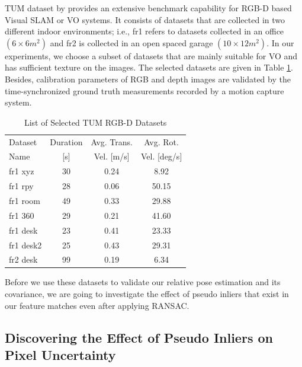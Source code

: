 \documentclass[12pt]{report}
\numberwithin{figure}{section}
\begin{document}
TUM dataset by \parencite{Sturm2012a} provides an extensive benchmark 
capability for RGB-D based Visual SLAM or VO systems. It consists of datasets 
that are collected in two different indoor environments; i.e., fr1 refers to 
datasets collected in an office $(6\times 6 m^2)$ and fr2 is collected in an 
open spaced garage $(10\times 12m^2)$. In our experiments, we choose a subset 
of datasets that are mainly suitable for VO and has sufficient texture on the 
images.  The selected datasets are given in Table \ref{tb:tum_dataset}.  
Besides, calibration parameters of RGB and depth images are validated by the 
time-synchronized ground truth measurements recorded by a motion capture 
system.

\begin{table}
\begin{center}
  \begin{tabular}{lccc}
    \hline
    Dataset & Duration & Avg. Trans. & Avg. Rot.\\
     Name & [s] & Vel. [m/s] & Vel. [deg/s]\\
    \hline
    fr1 xyz   & 30 & 0.24 & 8.92\\
    fr1 rpy   & 28 & 0.06 & 50.15\\
    fr1 room  & 49 & 0.33 & 29.88\\
    fr1 360   & 29 & 0.21 & 41.60\\
    fr1 desk  & 23 & 0.41 & 23.33\\
    fr1 desk2 & 25 & 0.43 & 29.31\\
    fr2 desk  & 99 & 0.19 & 6.34\\
    \hline
  \end{tabular}
\end{center}
  \caption{List of Selected TUM RGB-D Datasets}
  \label{tb:tum_dataset}
\end{table}

Before we use these datasets to validate 
our relative pose estimation and its covariance, 
we are going to investigate the effect of pseudo inliers that 
exist in our feature matches even after applying RANSAC. 

\subsection{Discovering the Effect of Pseudo Inliers on Pixel Uncertainty}\label{sc_pseudo_inliers}
\end{document}
